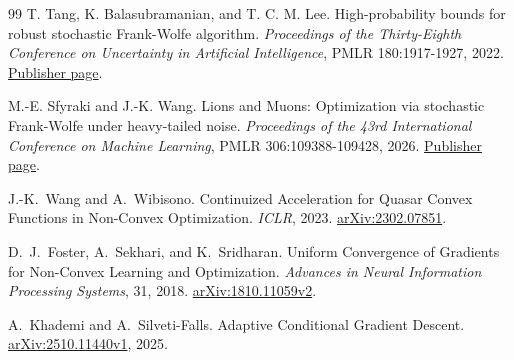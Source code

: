 \begin{thebibliography}{99}
T. Tang, K. Balasubramanian, and T. C. M. Lee.
High-probability bounds for robust stochastic Frank-Wolfe algorithm.
\emph{Proceedings of the Thirty-Eighth Conference on Uncertainty in
Artificial Intelligence}, PMLR 180:1917-1927, 2022.
\href{https://proceedings.mlr.press/v180/tang22a.html}{Publisher page}.

M.-E. Sfyraki and J.-K. Wang.
Lions and Muons: Optimization via stochastic Frank-Wolfe under
heavy-tailed noise.
\emph{Proceedings of the 43rd International Conference on Machine
Learning}, PMLR 306:109388-109428, 2026.
\href{https://proceedings.mlr.press/v306/sfyraki26a.html}{Publisher page}.

J.-K.~Wang and A.~Wibisono.
Continuized Acceleration for Quasar Convex Functions in Non-Convex Optimization.
\emph{ICLR}, 2023.
\href{https://arxiv.org/abs/2302.07851}{arXiv:2302.07851}.

D.~J.~Foster, A.~Sekhari, and K.~Sridharan.
Uniform Convergence of Gradients for Non-Convex Learning and Optimization.
\emph{Advances in Neural Information Processing Systems}, 31, 2018.
\href{https://arxiv.org/abs/1810.11059v2}{arXiv:1810.11059v2}.

A.~Khademi and A.~Silveti-Falls.
Adaptive Conditional Gradient Descent.
\href{https://arxiv.org/abs/2510.11440v1}{arXiv:2510.11440v1}, 2025.
\end{thebibliography}

